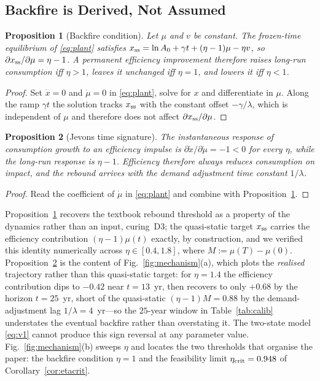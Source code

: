 \documentclass[conference,letterpaper,10pt]{IEEEtran}
\theoremstyle{plain}
\newtheorem{proposition}{Proposition}
\theoremstyle{remark}
\newcommand{\mudot}{\dot{\mu}}
\begin{document}
\subsection{Backfire is Derived, Not Assumed}
\begin{proposition}[Backfire condition]
\label{prop:backfire}
Let $\mu$ and $v$ be constant. The frozen-time equilibrium of
\eqref{eq:plant} satisfies
$x_{\rm ss}=\ln A_0+\gamma t+(\eta-1)\mu-\eta v$, so
$\partial x_{\rm ss}/\partial\mu=\eta-1$. A permanent efficiency
improvement therefore raises long-run consumption iff $\eta>1$, leaves
it unchanged iff $\eta=1$, and lowers it iff $\eta<1$.
\end{proposition}
\begin{proof}
Set $\dot x=0$ and $\mudot=0$ in \eqref{eq:plant}, solve for $x$ and
differentiate in $\mu$. Along the ramp $\gamma t$ the solution tracks
$x_{\rm ss}$ with the constant offset $-\gamma/\lambda$, which is
independent of $\mu$ and therefore does not affect
$\partial x_{\rm ss}/\partial\mu$.
\end{proof}

\begin{proposition}[Jevons time signature]
\label{prop:signature}
The instantaneous response of consumption growth to an efficiency
impulse is $\partial\dot x/\partial\mudot=-1<0$ for every $\eta$, while
the long-run response is $\eta-1$. Efficiency therefore always reduces
consumption on impact, and the rebound arrives with the demand
adjustment time constant $1/\lambda$.
\end{proposition}
\begin{proof}
Read the coefficient of $\mudot$ in \eqref{eq:plant} and combine with
Proposition~\ref{prop:backfire}.
\end{proof}

Proposition~\ref{prop:backfire} recovers the textbook rebound threshold
as a property of the dynamics rather than an input, curing~D3; the
quasi-static target $x_{\rm ss}$ carries the efficiency contribution
$(\eta-1)\mu(t)$ exactly, by construction, and we verified this
identity numerically across $\eta\in[0.4,1.8]$, where
$M:=\mu(T)-\mu(0)$. Proposition~\ref{prop:signature} is the content of
Fig.~\ref{fig:mechanism}(a), which plots the \emph{realised} trajectory
rather than this quasi-static target: for $\eta=1.4$ the efficiency
contribution dips to $-0.42$ near $t=13$~yr, then recovers to only
$+0.68$ by the horizon $t=25$~yr, short of the quasi-static
$(\eta-1)M=0.88$ by the demand-adjustment lag $1/\lambda=4$~yr---so the
$25$-year window in Table~\ref{tab:calib} understates the eventual
backfire rather than overstating it. The two-state model \eqref{eq:v1}
cannot produce this sign reversal at any parameter value.
Fig.~\ref{fig:mechanism}(b) sweeps
$\eta$ and locates the two thresholds that organise the paper: the
backfire condition $\eta=1$ and the feasibility limit
$\eta_{\rm crit}=0.948$ of Corollary~\ref{cor:etacrit}.
\end{document}
